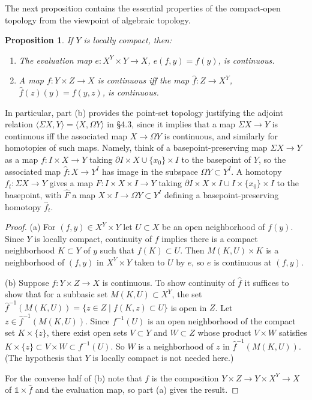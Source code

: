 \documentclass{article}
\newtheorem{proposition}[theorem]{Proposition}
\theoremstyle{definition}
\begin{document}
The next proposition contains the essential properties of the compact-open topology from the viewpoint of algebraic topology.

\begin{proposition}
If $Y$ is locally compact, then:
\begin{enumerate}
\item[(a)] The evaluation map $e: X^Y \times Y \rightarrow X$, $e(f, y) = f(y)$, is continuous.
\item[(b)] A map $f: Y \times Z \rightarrow X$ is continuous iff the map $\hat{f}: Z \rightarrow X^Y$, $\hat{f}(z)(y) = f(y, z)$, is continuous.
\end{enumerate}
\end{proposition}

In particular, part (b) provides the point-set topology justifying the adjoint relation $\langle \Sigma X, Y \rangle = \langle X, \Omega Y \rangle$ in \S4.3, since it implies that a map $\Sigma X \rightarrow Y$ is continuous iff the associated map $X \rightarrow \Omega Y$ is continuous, and similarly for homotopies of such maps. Namely, think of a basepoint-preserving map $\Sigma X \rightarrow Y$ as a map $f: I \times X \rightarrow Y$ taking $\partial I \times X \cup \{x_0\} \times I$ to the basepoint of $Y$, so the associated map $\hat{f}: X \rightarrow Y^I$ has image in the subspace $\Omega Y \subset Y^I$. A homotopy $f_t: \Sigma X \rightarrow Y$ gives a map $F: I \times X \times I \rightarrow Y$ taking $\partial I \times X \times I \cup I \times \{x_0\} \times I$ to the basepoint, with $\hat{F}$ a map $X \times I \rightarrow \Omega Y \subset Y^I$ defining a basepoint-preserving homotopy $\hat{f}_t$.

\begin{proof}
(a) For $(f, y) \in X^Y \times Y$ let $U \subset X$ be an open neighborhood of $f(y)$. Since $Y$ is locally compact, continuity of $f$ implies there is a compact neighborhood $K \subset Y$ of $y$ such that $f(K) \subset U$. Then $M(K, U) \times K$ is a neighborhood of $(f, y)$ in $X^Y \times Y$ taken to $U$ by $e$, so $e$ is continuous at $(f, y)$.

(b) Suppose $f: Y \times Z \to X$ is continuous. To show continuity of $\hat{f}$ it suffices to show that for a subbasic set $M(K, U) \subset X^Y$, the set $\hat{f}^{-1}(M(K, U)) = \{z \in Z \mid f(K, z) \subset U\}$ is open in $Z$. Let $z \in \hat{f}^{-1}(M(K, U))$. Since $f^{-1}(U)$ is an open neighborhood of the compact set $K \times \{z\}$, there exist open sets $V \subset Y$ and $W \subset Z$ whose product $V \times W$ satisfies $K \times \{z\} \subset V \times W \subset f^{-1}(U)$. So $W$ is a neighborhood of $z$ in $\hat{f}^{-1}(M(K, U))$. (The hypothesis that $Y$ is locally compact is not needed here.)

For the converse half of (b) note that $f$ is the composition $Y \times Z \to Y \times X^Y \to X$ of $\mathbb{1} \times \hat{f}$ and the evaluation map, so part (a) gives the result.
\end{proof}
\end{document}
